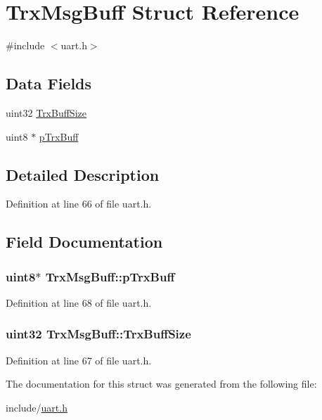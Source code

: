 \hypertarget{structTrxMsgBuff}{\section{Trx\-Msg\-Buff Struct Reference}
\label{structTrxMsgBuff}
}


{\ttfamily \#include $<$uart.\-h$>$}

\subsection*{Data Fields}
\begin{DoxyCompactItemize}
\item 
uint32 \hyperlink{structTrxMsgBuff_aee542f95d3ce814656ea3bdc22460c59}{Trx\-Buff\-Size}
\item 
uint8 $\ast$ \hyperlink{structTrxMsgBuff_ad16cb1fb229feafea7ce6a7142fcc4f8}{p\-Trx\-Buff}
\end{DoxyCompactItemize}


\subsection{Detailed Description}


Definition at line 66 of file uart.\-h.



\subsection{Field Documentation}
\hypertarget{structTrxMsgBuff_ad16cb1fb229feafea7ce6a7142fcc4f8}{
\subsubsection[{p\-Trx\-Buff}]{\setlength{\rightskip}{0pt plus 5cm}uint8$\ast$ Trx\-Msg\-Buff\-::p\-Trx\-Buff}}\label{structTrxMsgBuff_ad16cb1fb229feafea7ce6a7142fcc4f8}


Definition at line 68 of file uart.\-h.

\hypertarget{structTrxMsgBuff_aee542f95d3ce814656ea3bdc22460c59}{
\subsubsection[{Trx\-Buff\-Size}]{\setlength{\rightskip}{0pt plus 5cm}uint32 Trx\-Msg\-Buff\-::\-Trx\-Buff\-Size}}\label{structTrxMsgBuff_aee542f95d3ce814656ea3bdc22460c59}


Definition at line 67 of file uart.\-h.



The documentation for this struct was generated from the following file\-:\begin{DoxyCompactItemize}
\item 
include/\hyperlink{uart_8h}{uart.\-h}\end{DoxyCompactItemize}
